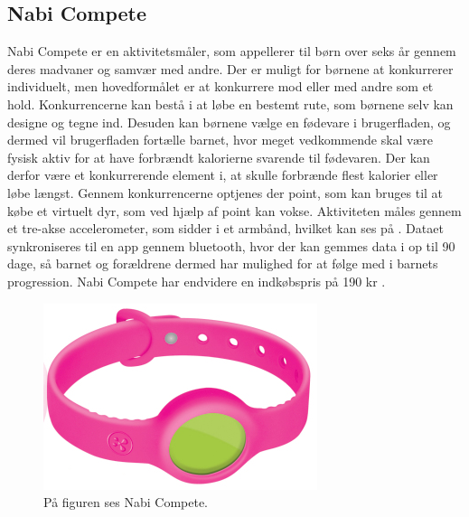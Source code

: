 \subsection{Nabi Compete}
Nabi Compete er en aktivitetsmåler, som appellerer til børn over seks år gennem deres madvaner og samvær med andre. Der er muligt for børnene at konkurrerer individuelt, men hovedformålet er at konkurrere mod eller med andre som et hold. Konkurrencerne kan bestå i at løbe en bestemt rute, som børnene selv kan designe og tegne ind. Desuden kan børnene vælge en fødevare i brugerfladen, og dermed vil brugerfladen fortælle barnet, hvor meget vedkommende skal være fysisk aktiv for at have forbrændt kalorierne svarende til fødevaren. Der kan derfor være et konkurrerende element i, at skulle forbrænde flest kalorier eller løbe længst. %
 Gennem konkurrencerne optjenes der point, som kan bruges til at købe et virtuelt dyr, som ved hjælp af point kan vokse. 
Aktiviteten måles gennem et tre-akse accelerometer, som sidder i et armbånd, hvilket kan ses på . Dataet synkroniseres til en app gennem bluetooth, hvor der kan gemmes data i op til 90 dage, så barnet og forældrene dermed har mulighed for at følge med i barnets progression. \citep{Fuhu_tech2015,Fuhu2015} 
Nabi Compete har endvidere en indkøbspris på 190 kr \citep{Fuhu_tech2015}. 

\begin{figure}[H]
	\centering
	\includegraphics[scale=0.8]{figures/aProblemanalyse/nabi.png}
	\caption{På figuren ses Nabi Compete. \citep{Perez2015}}
	\label{fig:nabi}
\end{figure}

